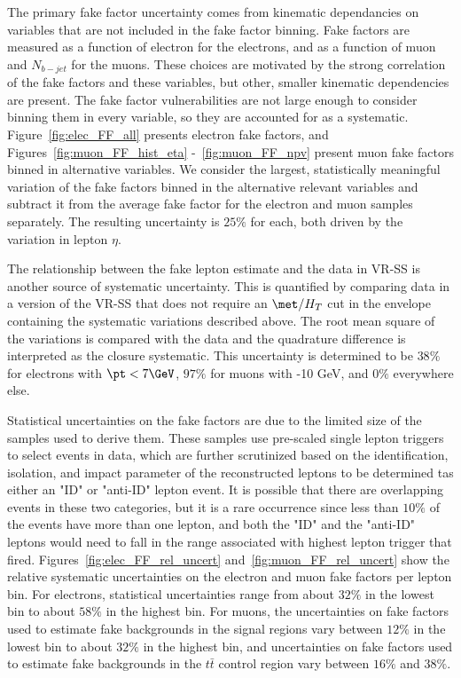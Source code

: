 The primary fake factor uncertainty comes from kinematic dependancies on variables that are not included in the fake factor binning.  Fake factors are measured as a function of electron \pt for the electrons, and as a function of muon \pt and $N_{b-jet}$ for the muons.  These choices are motivated by the strong correlation of the fake factors and these variables, but other, smaller kinematic dependencies are present.  The fake factor vulnerabilities are not large enough to consider binning them in every variable, so they are accounted for as a systematic. Figure~\ref{fig:elec_FF_all} presents electron fake factors, and Figures~\ref{fig:muon_FF_hist_eta} -~\ref{fig:muon_FF_npv} present muon fake factors binned in alternative variables.  We consider the largest, statistically meaningful variation of the fake factors binned in the alternative relevant variables and subtract it from the average fake factor for the electron and muon samples separately.  The resulting uncertainty is $25\%$ for each, both driven by the variation in lepton $\eta$.

The relationship between the fake lepton estimate and the data in VR-SS is another source of systematic uncertainty.  This is quantified by comparing data in a version of the VR-SS that does not require an $\met/H_T$ cut in the envelope containing the systematic variations described above.  The root mean square of the variations is compared with the data and the quadrature difference is interpreted as the closure systematic.  This uncertainty is determined to be $38\%$ for electrons with $\pt < 7\GeV$, $97\%$ for muons with -10 GeV, and $0\%$ everywhere else. %

Statistical uncertainties on the fake factors are due to the limited size of the samples used to derive them.  These samples use pre-scaled single lepton triggers to select events in data, which are further scrutinized based on the identification, isolation, and impact parameter of the reconstructed leptons to be determined tas either an "ID" or "anti-ID" lepton event.  It is possible that there are overlapping events in these two categories, but it is a rare occurrence since less than $10\%$ of the events have more than one lepton, and both the "ID" and the "anti-ID" leptons would need to fall in the \pt range associated with highest lepton \pt trigger that fired.  Figures~\ref{fig:elec_FF_rel_uncert} and~\ref{fig:muon_FF_rel_uncert} show the relative systematic uncertainties on the electron and muon fake factors per lepton \pt bin.   For electrons, statistical uncertainties range from about $32\%$ in the lowest \pt bin to about $58\%$ in the highest \pt bin.  For muons, the uncertainties on fake factors used to estimate fake backgrounds in the signal regions vary between $12\%$ in the lowest \pt bin to about $32\%$ in the highest \pt bin, and uncertainties on fake factors used to estimate fake backgrounds in the $t\bar{t}$ control region vary between $16\%$ and $38\%$.

